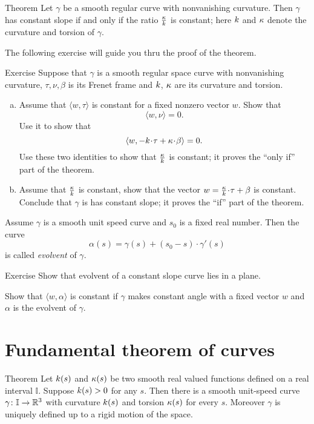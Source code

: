\begin{thm}{Theorem}
Let $\gamma$ be a smooth regular curve with nonvanishing curvature.
Then $\gamma$ has constant slope if and only if the ratio $\tfrac{\kappa}{k}$ is constant; here $k$ and $\kappa$
denote the curvature and torsion of $\gamma$.
\end{thm}

The following exercise will guide you thru the proof of the theorem. 

\begin{thm}{Exercise} \label{ex:lancret}
Suppose that $\gamma$ is a smooth regular space curve with nonvanishing curvature, $\tau,\nu,\beta$ 
is its Frenet frame and $k$, $\kappa$ are its curvature and torsion.
\begin{enumerate}[(a)]
\item\label{ex:lancret:a} 
Assume that  $\langle w,\tau\rangle$ is constant for a fixed nonzero vector $w$.
Show that 
\[\langle w, \nu\rangle =0.\]
Use it to show that 
\[\langle w, -\kur\cdot\tau+\tor\cdot \beta\rangle =0.\]
Use these two identities to show that $\tfrac{\kappa}{k}$ is constant;
it proves the ``only if'' part of the theorem.

\item Assume that $\tfrac{\kappa}{k}$ is constant, show that the vector $w=\tfrac\tor\kur\cdot \tau+\beta$ is constant.
Conclude that $\gamma$ is has constant slope; it proves the ``if'' part of the theorem.
\end{enumerate}
\end{thm}

Assume $\gamma$ is a smooth unit speed curve and $s_0$ is a fixed real number.
Then the curve 
\[\alpha(s)=\gamma(s)+(s_0-s)\cdot \gamma'(s)\]
is called \emph{evolvent} of $\gamma$.

\begin{thm}{Exercise} 
Show that evolvent of a constant slope curve lies in a plane.
\end{thm}

Show that $\langle w,\alpha\rangle$ is constant if $\gamma$ makes constant angle with a fixed vector $w$ and $\alpha$ is the evolvent of $\gamma$.
 
\section*{Fundamental theorem of curves}

\begin{thm}{Theorem}\label{thm:fund-curves}
Let $k(s)$ and $\kappa(s)$ be two smooth real valued functions defined on a real interval $\mathbb{I}$.
Suppose $k(s)>0$ for any $s$.
Then there is a smooth unit-speed curve $\gamma\colon\mathbb{I}\to\mathbb{R}^3$ with curvature $k(s)$ and torsion $\kappa(s)$ for every $s$.
Moreover $\gamma$ is uniquely defined up to a rigid motion of the space.
\end{thm}

